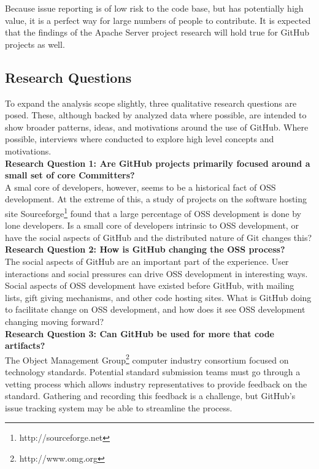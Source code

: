 \documentclass{proc}
\begin{document}
Because issue reporting is of low risk to the code base, but has potentially high value, it is a perfect way for large numbers of people to contribute. It is expected that the findings of the Apache Server project research will hold true for GitHub projects as well.

\subsection{Research Questions}
To expand the analysis scope slightly, three qualitative research questions are posed. These, although backed by analyzed data where possible, are intended to show broader patterns, ideas, and motivations around the use of GitHub. Where possible, interviews\cite{begel2013social} where conducted to explore high level concepts and motivations.\\

\noindent \textbf{Research Question 1: Are GitHub projects primarily focused around a small set of core Committers?}\\
A smal core of developers, however, seems to be a historical fact of OSS development\cite{mockus2000case,mockus2002two,krishnamurthy2002cave}. At the extreme of this, a study of projects on the software hosting site Sourceforge\footnote{http://sourceforge.net} found that a large percentage of OSS development is done by lone developers. Is a small core of developers intrinsic to OSS development, or have the social aspects of GitHub and the distributed nature of Git changes this?\\

\noindent \textbf{Research Question 2: How is GitHub changing the OSS process?}\\
The social aspects of GitHub are an important part of the experience\cite{dabbish2012social}. User interactions and social pressures can drive OSS development in interesting ways. Social aspects of OSS development have existed before GitHub, with mailing lists\cite{mockus2000case}, gift giving mechanisms\cite{bergquist2008power}, and other code hosting sites. What is GitHub doing to facilitate change on OSS development, and how does it see OSS development changing moving forward?\\

\noindent \textbf{Research Question 3: Can GitHub be used for more that code artifacts?}\\
The Object Management Group\textregistered\footnote{http://www.omg.org} computer industry consortium focused on technology standards. Potential standard submission teams must go through a vetting process\cite{kobryn1999uml} which allows industry representatives to provide feedback on the standard. Gathering and recording this feedback is a challenge, but GitHub's issue tracking system may be able to streamline the process.
\end{document}

